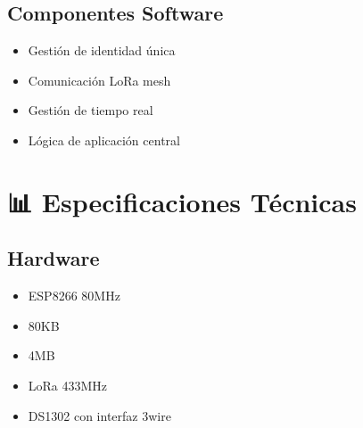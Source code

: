 \documentclass[a4paper,11pt,spanish]{sphinxmanual}
\begin{document}
\section{Componentes Software}
\label{\detokenize{index:componentes-software}}\begin{itemize}
\item {} 
\sphinxAtStartPar
{} Gestión de identidad única

\item {} 
\sphinxAtStartPar
{} Comunicación LoRa mesh

\item {} 
\sphinxAtStartPar
{} Gestión de tiempo real

\item {} 
\sphinxAtStartPar
{} Lógica de aplicación central

\end{itemize}


\chapter{📊 Especificaciones Técnicas}
\label{\detokenize{index:especificaciones-tecnicas}}

\section{Hardware}
\label{\detokenize{index:hardware}}\begin{itemize}
\item {} 
\sphinxAtStartPar
{} ESP8266 80MHz

\item {} 
\sphinxAtStartPar
{} 80KB

\item {} 
\sphinxAtStartPar
{} 4MB

\item {} 
\sphinxAtStartPar
{} LoRa 433MHz

\item {} 
\sphinxAtStartPar
{} DS1302 con interfaz 3\sphinxhyphen{}wire

\end{itemize}
\end{document}
